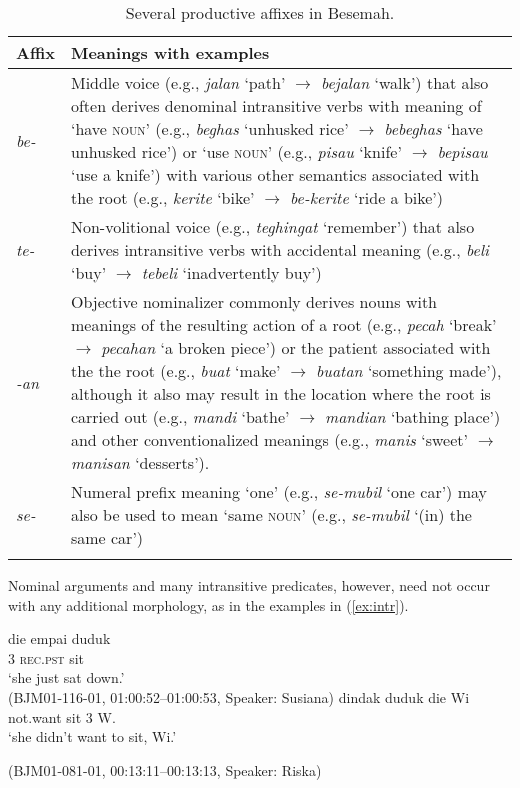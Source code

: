 \documentclass[output=paper,
\ChapterDOI{10.5281/zenodo.15697583}
colorlinks,
citecolor=brown]{langscibook}
\begin{document}
\begin{table}
\caption{Several productive affixes in Besemah.}
\label{tab:morphology}
\begin{tabularx}{1\textwidth}{L{1cm} X}
\lsptoprule
 {Affix}         &  {Meanings with examples}\\
\midrule
\textit{be-} 
& Middle voice (e.g., \textit{jalan} `path' $\rightarrow$ \textit{bejalan} `walk') that also often derives denominal intransitive verbs with meaning of `have \textsc{noun}' (e.g., \textit{beghas} `unhusked rice' $\rightarrow$ \textit{bebeghas} `have unhusked rice') or `use \textsc{noun}' (e.g., \textit{pisau} `knife' $\rightarrow$ \textit{bepisau} `use a knife') with various other semantics associated with the root (e.g., \textit{kerite} `bike' $\rightarrow$ \textit{be-kerite} `ride a bike') \\
\textit{te-}
& Non-volitional voice (e.g., \textit{teghingat} `remember') that also derives intransitive verbs with accidental meaning (e.g., \textit{beli} `buy' $\rightarrow$ \textit{tebeli} `inadvertently buy')\\
\textit{-an}
& Objective nominalizer commonly derives nouns with meanings of the resulting action of a root (e.g., \textit{pecah} `break' $\rightarrow$ \textit{pecahan} `a broken piece') or the patient associated with the the root (e.g., \textit{buat} `make' $\rightarrow$ \textit{buatan} `something made'), although it also may result in the location where the root is carried out (e.g., \textit{mandi} `bathe' $\rightarrow$ \textit{mandian} `bathing place') and other conventionalized meanings (e.g., \textit{manis} `sweet' $\rightarrow$ \textit{manisan} `desserts').\\
\textit{se-}
& Numeral prefix meaning `one' (e.g., \textit{se-mubil} `one car') may also be used to mean `same \textsc{noun}' (e.g., \textit{se-mubil} `(in) the same car')\\
\lspbottomrule
\end{tabularx}
\end{table}

Nominal arguments and many intransitive predicates, however, need not occur with any additional morphology, as in the examples in (\ref{ex:intr}). 

\begin{exe}
    \ex\label{ex:intr}
    \begin{xlist}
        \ex\label{ex:intr-sv}
        \gll die empai duduk\\
        3 \textsc{rec.pst} sit\\
        \trans `she just sat down.'\\
        \hfill(BJM01-116-01, 01:00:52–01:00:53, Speaker: Susiana)
        \ex\label{ex:intr-vs} 
        \gll dindak duduk die Wi\\
        not.want sit 3 W.\\
        \trans `she didn't want to sit, Wi.'
    \end{xlist}
    \hfill (BJM01-081-01, 00:13:11–00:13:13, Speaker: Riska)
\end{exe}
\end{document}
